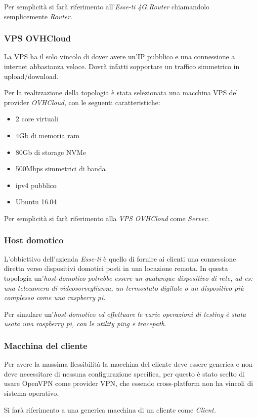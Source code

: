 Per semplicità si farà riferimento all'\textit{Esse-ti 4G.Router} chiamandolo semplicemente \textit{Router}.

\subsubsection{VPS OVHCloud}
\label{subsec:vps-ovhcloud}

La VPS ha il solo vincolo di dover avere un'IP pubblico e una connessione a internet abbastanza veloce. Dovrà infatti sopportare un traffico simmetrico in upload/download.

Per la realizzazione della topologia è stata selezionata una macchina VPS del provider \textit{OVHCloud}, con le seguenti caratteristiche:

\begin{itemize}[noitemsep]
	\itemsep0em
	\item 2 core virtuali
	\item 4Gb di memoria ram
	\item 80Gb di storage NVMe
	\item 500Mbps simmetrici di banda
	\item ipv4 pubblico
	\item Ubuntu 16.04
\end{itemize}

Per semplicità si farà riferimento alla \textit{VPS OVHCloud} come \textit{Server}.

\subsubsection{Host domotico}

L'obbiettivo dell'azienda \textit{Esse-ti} è quello di fornire ai clienti una connessione diretta verso dispositivi domotici posti in una locazione remota. In questa topologia un'\it{host-domotico} potrebbe essere un qualunque dispositivo di rete, ad es: una telecamera di videosorveglianza, un termostato digitale o un dispositivo più complesso come una raspberry pi.

Per simulare un'\it{host-domotico} ed effettuare le varie operazioni di testing è stata usata una \textit{raspberry pi}, con le utility \textit{ping} e \textit{tracepath}.

\subsubsection{Macchina del cliente}
\label{subsec:macchina-cliente}

Per avere la massima flessibilità la macchina del cliente deve essere generica e non deve necessitare di nessuna configurazione specifica, per questo è stato scelto di usare OpenVPN come provider VPN, che essendo cross-platform non ha vincoli di sistema operativo.

Si farà riferimento a una generica macchina di un cliente come \it{Client}.


